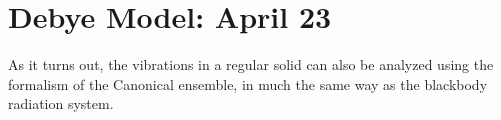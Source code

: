 \section{Debye Model: April 23}
As it turns out, the vibrations in a regular solid can also be analyzed using
the formalism of the Canonical ensemble, in much the same way as the blackbody
radiation system.



